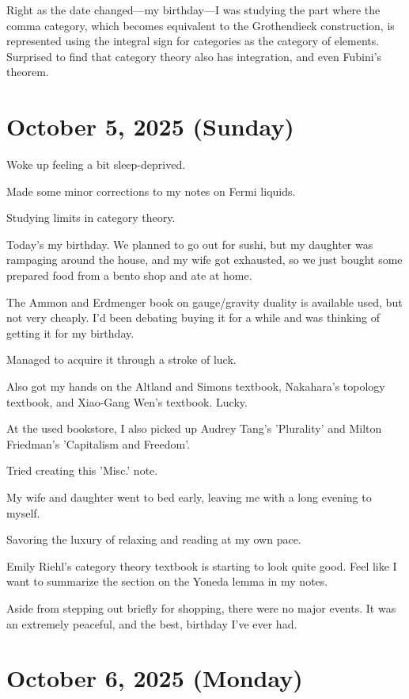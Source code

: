 \documentclass{article}
\begin{document}
Right as the date changed---my birthday---I was studying the part where the comma category, which becomes equivalent to the Grothendieck construction, is represented using the integral sign for categories as the category of elements.
Surprised to find that category theory also has integration, and even Fubini's theorem.

\section{October 5, 2025 (Sunday)}

Woke up feeling a bit sleep-deprived.

Made some minor corrections to my notes on Fermi liquids.

Studying limits in category theory.

Today's my birthday. We planned to go out for sushi, but my daughter was rampaging around the house, and my wife got exhausted, so we just bought some prepared food from a bento shop and ate at home.

The Ammon and Erdmenger book on gauge/gravity duality is available used, but not very cheaply. I'd been debating buying it for a while and was thinking of getting it for my birthday.

Managed to acquire it through a stroke of luck.

Also got my hands on the Altland and Simons textbook, Nakahara's topology textbook, and Xiao-Gang Wen's textbook. Lucky.

At the used bookstore, I also picked up Audrey Tang's 'Plurality' and Milton Friedman's 'Capitalism and Freedom'.

Tried creating this 'Misc.' note.

My wife and daughter went to bed early, leaving me with a long evening to myself.

Savoring the luxury of relaxing and reading at my own pace.

Emily Riehl's category theory textbook is starting to look quite good.
Feel like I want to summarize the section on the Yoneda lemma in my notes.

Aside from stepping out briefly for shopping, there were no major events. It was an extremely peaceful, and the best, birthday I've ever had.

\section{October 6, 2025 (Monday)}
\end{document}
